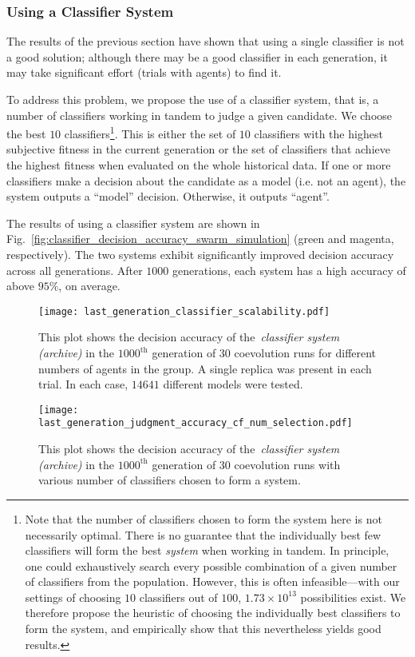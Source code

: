 \subsubsection{Using a Classifier System}

The results of the previous section have shown that using a single classifier is not a good solution; although there may be a good classifier in each generation, it may take significant effort (trials with agents) to find it.

To address this problem, we propose the use of a classifier system, that is, a number of classifiers working in tandem to judge a given candidate. We choose the best $10$ classifiers\footnote{Note that the number of classifiers chosen to form the system here is not necessarily optimal. There is no guarantee that the individually best few classifiers will form the best \emph{system} when working in tandem. In principle, one could exhaustively search every possible combination of a given number of classifiers from the population. However, this is often infeasible---with our settings of choosing $10$ classifiers out of $100$, $1.73\times 10^{13}$ possibilities exist. We therefore propose the heuristic of choosing the individually best classifiers to form the system, and empirically show that this nevertheless yields good results.}. This is either the set of $10$ classifiers with the highest subjective fitness in the current generation or the set of classifiers that achieve the highest fitness when evaluated on the whole historical data. If one or more classifiers make a decision about the candidate as a model (i.e. not an agent), the system outputs a ``model'' decision. Otherwise, it outputs ``agent''.

The results of using a classifier system are shown in Fig.~\ref{fig:classifier_decision_accuracy_swarm_simulation} (green and magenta, respectively). The two systems exhibit significantly improved decision accuracy across all generations. After $1000$ generations, each system has a high accuracy of above $95\%$, on average. 
\begin{figure}[!t]
    \centering
    \texttt{[image: last\_generation\_classifier\_scalability.pdf]}
    \caption{This plot shows the decision accuracy of the~\textit{classifier system (archive)} in the $1000^\mathrm{th}$ generation of $30$ coevolution runs for different numbers of agents in the group. A single replica was present in each trial. In each case, $14641$ different models were tested.}
    \label{fig:classifier_scalability_aggregation}
\end{figure}
%
\begin{figure}[!t]%
	\centering
	\texttt{[image: last\_generation\_judgment\_accuracy\_cf\_num\_selection.pdf]}
	\caption{This plot shows the decision accuracy of the~\textit{classifier system (archive)} in the $1000^\mathrm{th}$ generation of $30$ coevolution runs with various number of classifiers chosen to form a system.}
	\label{fig:last_generation_judgment_accuracy_cf_num_selection}
\end{figure}

